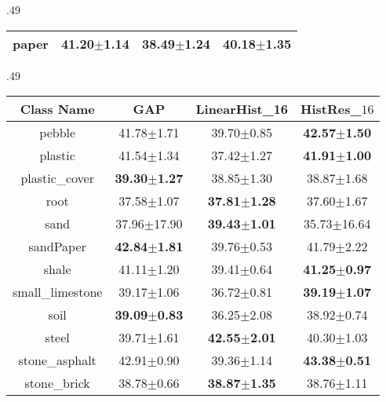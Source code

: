 \documentclass[journal]{IEEEtai}
\begin{document}
\begin{table*}[h]
\begin{subtable}[htb]{.49\textwidth}
\begin{tabular}{|c|c|c|c|}
            paper            & \textbf{41.20$\pm$1.14}  &38.49$\pm$1.24 & 40.18$\pm$1.35                        \\ \hline
        \end{tabular}
		\caption{FDR Scores for first 16 classes}
		\label{tab:FDR_A}
		\end{subtable}
		\begin{subtable}[h]{.49\textwidth}
			\centering
        \begin{tabular}{|c|c|c|c|}
            \hline
            Class Name       & GAP      & LinearHist\_16 & HistRes\_$16$                \\ \hline
            pebble           & 41.78$\pm$1.71  & 39.70$\pm$0.85 & \textbf{42.57$\pm$1.50}             \\ \hline
            plastic          & 41.54$\pm$1.34    & 37.42$\pm$1.27          & \textbf{41.91$\pm$1.00}             \\ \hline
            plastic\_cover   & \textbf{39.30$\pm$1.27}    & 38.85$\pm$1.30   & 38.87$\pm$1.68                      \\ \hline
            root             & 37.58$\pm$1.07       & \textbf{37.81$\pm$1.28}    & {37.60$\pm$1.67}             \\ \hline
            sand             & {37.96$\pm$17.90}   & \textbf{39.43$\pm$1.01}    & 35.73$\pm$16.64                     \\ \hline
            sandPaper        & \textbf{42.84$\pm$1.81}   & 39.76$\pm$0.53  & 41.79$\pm$2.22                      \\ \hline
            shale            & 41.11$\pm$1.20     & 39.41$\pm$0.64 & \textbf{41.25$\pm$0.97}             \\ \hline
            small\_limestone & 39.17$\pm$1.06     & 36.72$\pm$0.81                          & \textbf{39.19$\pm$1.07}             \\ \hline
            soil             & \textbf{39.09$\pm$0.83}   & 36.25$\pm$2.08    & 38.92$\pm$0.74                      \\ \hline
            steel            & 39.71$\pm$1.61   & \textbf{42.55$\pm$2.01}                       & {40.30$\pm$1.03}              \\ \hline
            stone\_asphalt   & 42.91$\pm$0.90   & 39.36$\pm$1.14                             & \textbf{43.38$\pm$0.51}             \\ \hline
            stone\_brick     & {38.78$\pm$0.66} & \textbf{38.87$\pm$1.35}  & 38.76$\pm$1.11                      \\ \hline

\end{tabular}
\end{subtable}
\end{table*}
\end{document}
